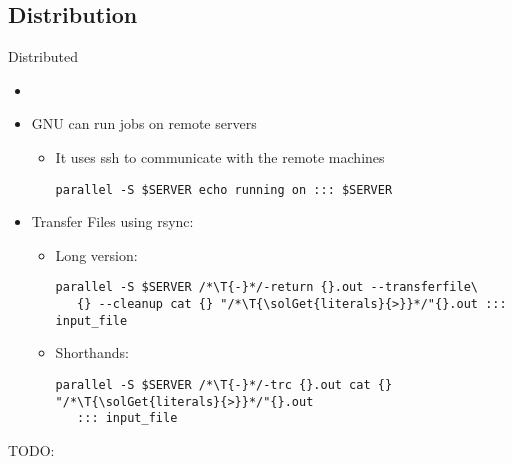 \subsection{Distribution}
{
\begin{frame}[fragile]{Distributed}
\begin{itemize}[<+(1)->]
   \itemsep6pt
   \item {}
   \item GNU \LogoParallel can run jobs on remote servers \begin{itemize}
      \item It uses ssh to communicate with the remote machines
      \begin{verbatim}
parallel -S $SERVER echo running on ::: $SERVER
      \end{verbatim}
   \end{itemize}
   \item Transfer Files using rsync:
\begin{itemize}
   \item Long version:
   \begin{verbatim}
parallel -S $SERVER /*\T{-}*/-return {}.out --transferfile\
   {} --cleanup cat {} "/*\T{\solGet{literals}{>}}*/"{}.out ::: input_file
   \end{verbatim}
   \item Shorthands:
\begin{verbatim}
parallel -S $SERVER /*\T{-}*/-trc {}.out cat {} "/*\T{\solGet{literals}{>}}*/"{}.out
   ::: input_file
\end{verbatim}
\end{itemize}
\end{itemize}
TODO:
\end{frame}
}
